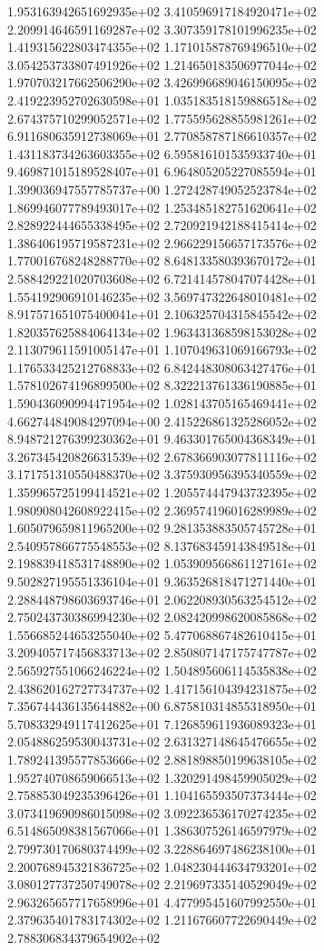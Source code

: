1.953163942651692935e+02 3.410596917184920471e+02 2.209914646591169287e+02
3.307359178101996235e+02 1.419315622803474355e+02 1.171015878769496510e+02
3.054253733807491926e+02 1.214650183506977044e+02 1.970703217662506290e+02
3.426996689046150095e+02 2.419223952702630598e+01 1.035183518159886518e+02
2.674375710299052571e+02 1.775595628855981261e+02 6.911680635912738069e+01
2.770858787186610357e+02 1.431183734263603355e+02 6.595816101535933740e+01
9.469871015189528407e+01 6.964805205227085594e+01 1.399036947557785737e+00
1.272428749052523784e+02 1.869946077789493017e+02 1.253485182751620641e+02
2.828922444655338495e+02 2.720921942188415414e+02 1.386406195719587231e+02
2.966229156657173576e+02 1.770016768248288770e+02 8.648133580393670172e+01
2.588429221020703608e+02 6.721414578047074428e+01 1.554192906910146235e+02
3.569747322648010481e+02 8.917571651075400041e+01 2.106325704315845542e+02
1.820357625884064134e+02 1.963431368598153028e+02 2.113079611591005147e+01
1.107049631069166793e+02 1.176533425212768833e+02 6.842448308063427476e+01
1.578102674196899500e+02 8.322213761336190885e+01 1.590436090994471954e+02
1.028143705165469441e+02 4.662744849084297094e+00 2.415226861325286052e+02
8.948721276399230362e+01 9.463301765004368349e+01 3.267345420826631539e+02
2.678366903077811116e+02 3.171751310550488370e+02 3.375930956395340559e+02
1.359965725199414521e+02 1.205574447943732395e+02 1.980908042608922415e+02
2.369574196016289989e+02 1.605079659811965200e+02 9.281353883505745728e+01
2.540957866775548553e+02 8.137683459143849518e+01 2.198839418531748890e+02
1.053909566861127161e+02 9.502827195551336104e+01 9.363526818471271440e+01
2.288448798603693746e+01 2.062208930563254512e+02 2.750243730386994230e+02
2.082420998620085868e+02 1.556685244653255040e+02 5.477068867482610415e+01
3.209405717456833713e+02 2.850807147175747787e+02 2.565927551066246224e+02
1.504895606114535838e+02 2.438620162727734737e+02 1.417156104394231875e+02
7.356744436135644882e+00 6.875810314855318950e+01 5.708332949117412625e+01
7.126859611936089323e+01 2.054886259530043731e+02 2.631327148645476655e+02
1.789241395577853666e+02 2.881898850199638105e+02 1.952740708659066513e+02
1.320291498459905029e+02 2.758853049235396426e+01 1.104165593507373444e+02
3.073419690986015098e+02 3.092236536170274235e+02 6.514865098381567066e+01
1.386307526146597979e+02 2.799730170680374499e+02 3.228864697486238100e+01
2.200768945321836725e+02 1.048230444634793201e+02 3.080127737250749078e+02
2.219697335140529049e+02 2.963265657717658996e+01 4.477995451607992550e+01
2.379635401783174302e+02 1.211676607722690449e+02 2.788306834379654902e+02
